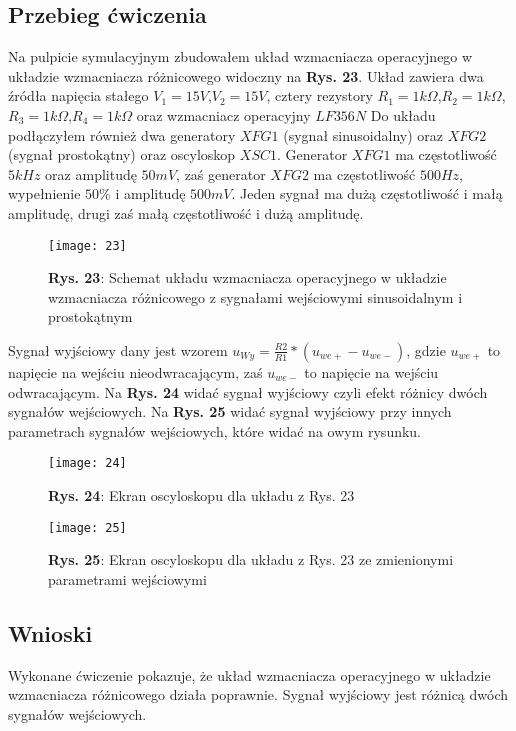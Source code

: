 \documentclass[11pt]{article}
\begin{document}
\subsection{Przebieg ćwiczenia}
Na pulpicie symulacyjnym zbudowałem układ wzmacniacza operacyjnego w układzie wzmacniacza różnicowego widoczny na \textbf{Rys. 23}. Układ zawiera dwa źródła napięcia stałego $V_1=15V$,$V_2=15V$, cztery rezystory $R_1=1k\Omega$,$R_2=1k\Omega$,$R_3=1k\Omega$,$R_4=1k\Omega$ oraz wzmacniacz operacyjny $LF356N$ Do układu podłączyłem również dwa generatory $XFG1$ (sygnał sinusoidalny) oraz $XFG2$ (sygnał prostokątny) oraz oscyloskop $XSC1$. Generator $XFG1$ ma częstotliwość $5kHz$ oraz amplitudę $50mV$, zaś generator $XFG2$ ma częstotliwość $500Hz$, wypełnienie $50\%$ i amplitudę $500mV$. Jeden sygnał ma dużą częstotliwość i małą amplitudę, drugi zaś małą częstotliwość i dużą amplitudę.
\begin{figure}[H]
\centering
\texttt{[image: 23]}
\caption*{\textbf{Rys. 23}: Schemat układu wzmacniacza operacyjnego w układzie wzmacniacza różnicowego z sygnałami wejściowymi sinusoidalnym i prostokątnym}
\end{figure}
\noindent Sygnał wyjściowy dany jest wzorem $u_{Wy}=\frac{R2}{R1}*(u_{we+}-u_{we-})$, gdzie $u_{we+}$ to napięcie na wejściu nieodwracającym, zaś $u_{we-}$ to napięcie na wejściu odwracającym. Na \textbf{Rys. 24} widać sygnał wyjściowy czyli efekt różnicy dwóch sygnałów wejściowych. Na \textbf{Rys. 25} widać sygnał wyjściowy przy innych parametrach sygnałów wejściowych, które widać na owym rysunku.
\begin{figure}[H]
\centering
\texttt{[image: 24]}
\caption*{\textbf{Rys. 24}: Ekran oscyloskopu dla układu z Rys. 23}
\end{figure}
\begin{figure}[H]
\centering
\texttt{[image: 25]}
\caption*{\textbf{Rys. 25}: Ekran oscyloskopu dla układu z Rys. 23 ze zmienionymi parametrami wejściowymi}
\end{figure}
\subsection{Wnioski}
Wykonane ćwiczenie pokazuje, że układ wzmacniacza operacyjnego w układzie wzmacniacza różnicowego działa poprawnie. Sygnał wyjściowy jest różnicą dwóch sygnałów wejściowych.
\end{document}
